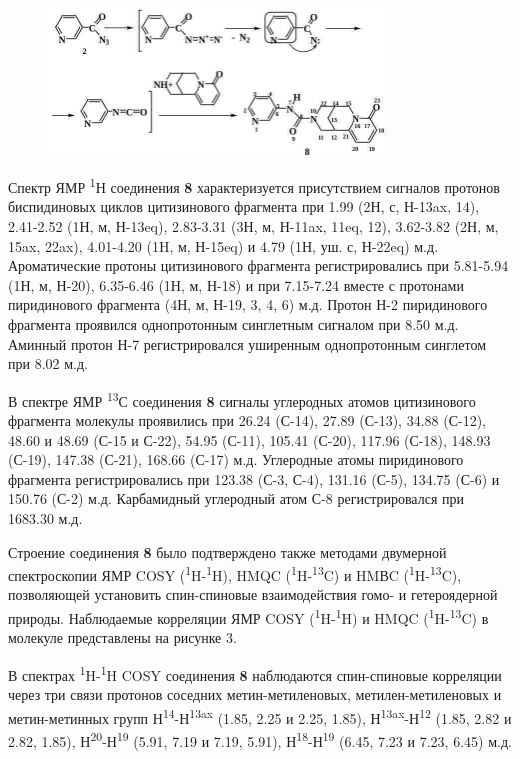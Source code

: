 \begin{figure}[H]
	\centering
	\includegraphics[width=0.8\textwidth]{assets/10}
	\caption*{}
\end{figure}

\begin{multicols}{2}
Спектр ЯМР \textsuperscript{1}Н соединения {\bfseries 8} характеризуется
присутствием сигналов протонов биспидиновых циклов цитизинового
фрагмента при 1.99 (2Н, с, Н-13ax, 14), 2.41-2.52 (1Н, м, Н-13eq),
2.83-3.31 (3Н, м, Н-11ax, 11eq, 12), 3.62-3.82 (2Н, м, 15ax, 22ax),
4.01-4.20 (1H, м, Н-15eq) и 4.79 (1Н, уш. с, Н-22eq) м.д. Ароматические
протоны цитизинового фрагмента регистрировались при 5.81-5.94 (1Н, м,
Н-20), 6.35-6.46 (1Н, м, Н-18) и при 7.15-7.24 вместе с протонами
пиридинового фрагмента (4Н, м, Н-19, 3, 4, 6) м.д. Протон Н-2
пиридинового фрагмента проявился однопротонным синглетным сигналом при
8.50 м.д. Аминный протон Н-7 регистрировался уширенным однопротонным
синглетом при 8.02 м.д.

В спектре ЯМР \textsuperscript{13}С соединения {\bfseries 8} сигналы
углеродных атомов цитизинового фрагмента молекулы проявились при 26.24
(С-14), 27.89 (С-13), 34.88 (С-12), 48.60 и 48.69 (С-15 и С-22), 54.95
(С-11), 105.41 (С-20), 117.96 (С-18), 148.93 (С-19), 147.38 (С-21),
168.66 (С-17) м.д. Углеродные атомы пиридинового фрагмента
регистрировались при 123.38 (С-3, С-4), 131.16 (С-5), 134.75 (С-6) и
150.76 (С-2) м.д. Карбамидный углеродный атом С-8 регистрировался при
1683.30 м.д.

Строение соединения {\bfseries 8} было подтверждено также методами
двумерной спектроскопии ЯМР COSY
(\textsuperscript{1}H-\textsuperscript{1}H), HMQC
(\textsuperscript{1}H-\textsuperscript{13}C) и HMВC
(\textsuperscript{1}H-\textsuperscript{13}C), позволяющей установить
спин-спиновые взаимодействия гомо- и гетероядерной природы. Наблюдаемые
корреляции ЯМР COSY (\textsuperscript{1}H-\textsuperscript{1}H) и HMQC
(\textsuperscript{1}H-\textsuperscript{13}C) в молекуле представлены на
рисунке 3.

В спектрах \textsuperscript{1}H-\textsuperscript{1}H COSY соединения
{\bfseries 8} наблюдаются спин-спиновые корреляции через три связи протонов
соседних метин-метиленовых, метилен-метиленовых и метин-метинных групп
Н\textsuperscript{14}-Н\textsuperscript{13ax} (1.85, 2.25 и 2.25, 1.85),
Н\textsuperscript{13ax}-Н\textsuperscript{12} (1.85, 2.82 и 2.82, 1.85),
Н\textsuperscript{20}-Н\textsuperscript{19} (5.91, 7.19 и 7.19, 5.91),
Н\textsuperscript{18}-Н\textsuperscript{19} (6.45, 7.23 и 7.23, 6.45)
м.д.


\end{multicols}
